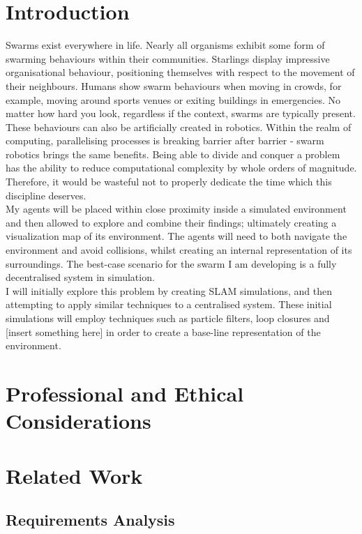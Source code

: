 \documentclass[12pt]{article}
\begin{document}
\section{Introduction}
Swarms exist everywhere in life. Nearly all organisms exhibit some form of swarming behaviours within their
communities. Starlings display impressive organisational behaviour, positioning themselves with respect to the
movement of their neighbours. Humans show swarm behaviours when moving in crowds, for example, moving around sports
venues or exiting buildings in emergencies. No matter how hard you look, regardless if the context, swarms are
typically present.\\
These behaviours can also be artificially created in robotics. Within the realm of computing, parallelising
processes is breaking barrier after barrier - swarm robotics brings the same benefits. Being able to divide and
conquer a problem has the ability to reduce computational complexity by whole orders of magnitude. Therefore, it
would be wasteful not to properly dedicate the time which this discipline deserves.\\
My agents will be placed within close proximity inside a simulated environment and then allowed to explore and
combine their findings; ultimately creating a visualization map of its environment. The agents will need to both
navigate the environment and avoid collisions, whilst creating an internal representation of its surroundings. The
best-case scenario for the swarm I am developing is a fully decentralised system in simulation.\\
I will initially explore this problem by creating SLAM simulations, and then attempting to apply similar techniques
to a centralised system. These initial simulations will employ techniques such as particle filters, loop closures
and [insert something here] in order to create a base-line representation of the environment.

\section{Professional and Ethical Considerations}
\lipsum[1-2]

\section{Related Work}
\lipsum[3-4]

\subsection{Requirements Analysis}
\lipsum[5]
\end{document}
